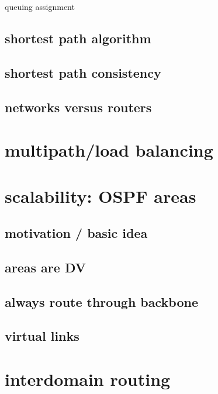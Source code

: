 \begin{frame}{queuing assignment}
\subsection{shortest path algorithm}


\subsection{shortest path consistency}


\subsection{networks versus routers}
 

\section{multipath/load balancing}


\section{scalability: OSPF areas} %

\subsection{motivation / basic idea}



\subsection{areas are DV}



\subsection{always route through backbone}


\subsection{virtual links}


\section{interdomain routing}



\end{frame}
